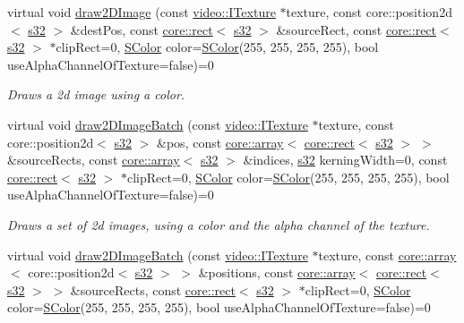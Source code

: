 \begin{DoxyCompactItemize}
virtual void \hyperlink{classirr_1_1video_1_1IVideoDriver_a167d3a5e2ea5804bfa9ba9e526bbcdb3}{draw2\+D\+Image} (const \hyperlink{classirr_1_1video_1_1ITexture}{video\+::\+I\+Texture} $\ast$texture, const core\+::position2d$<$ \hyperlink{namespaceirr_ac66849b7a6ed16e30ebede579f9b47c6}{s32} $>$ \&dest\+Pos, const \hyperlink{classirr_1_1core_1_1rect}{core\+::rect}$<$ \hyperlink{namespaceirr_ac66849b7a6ed16e30ebede579f9b47c6}{s32} $>$ \&source\+Rect, const \hyperlink{classirr_1_1core_1_1rect}{core\+::rect}$<$ \hyperlink{namespaceirr_ac66849b7a6ed16e30ebede579f9b47c6}{s32} $>$ $\ast$clip\+Rect=0, \hyperlink{classirr_1_1video_1_1SColor}{S\+Color} color=\hyperlink{classirr_1_1video_1_1SColor}{S\+Color}(255, 255, 255, 255), bool use\+Alpha\+Channel\+Of\+Texture=false)=0
\begin{DoxyCompactList}\small\item\em Draws a 2d image using a color. \end{DoxyCompactList}\item 
virtual void \hyperlink{classirr_1_1video_1_1IVideoDriver_a1b7647e900a56f23abb0809fd533617e}{draw2\+D\+Image\+Batch} (const \hyperlink{classirr_1_1video_1_1ITexture}{video\+::\+I\+Texture} $\ast$texture, const core\+::position2d$<$ \hyperlink{namespaceirr_ac66849b7a6ed16e30ebede579f9b47c6}{s32} $>$ \&pos, const \hyperlink{classirr_1_1core_1_1array}{core\+::array}$<$ \hyperlink{classirr_1_1core_1_1rect}{core\+::rect}$<$ \hyperlink{namespaceirr_ac66849b7a6ed16e30ebede579f9b47c6}{s32} $>$ $>$ \&source\+Rects, const \hyperlink{classirr_1_1core_1_1array}{core\+::array}$<$ \hyperlink{namespaceirr_ac66849b7a6ed16e30ebede579f9b47c6}{s32} $>$ \&indices, \hyperlink{namespaceirr_ac66849b7a6ed16e30ebede579f9b47c6}{s32} kerning\+Width=0, const \hyperlink{classirr_1_1core_1_1rect}{core\+::rect}$<$ \hyperlink{namespaceirr_ac66849b7a6ed16e30ebede579f9b47c6}{s32} $>$ $\ast$clip\+Rect=0, \hyperlink{classirr_1_1video_1_1SColor}{S\+Color} color=\hyperlink{classirr_1_1video_1_1SColor}{S\+Color}(255, 255, 255, 255), bool use\+Alpha\+Channel\+Of\+Texture=false)=0
\begin{DoxyCompactList}\small\item\em Draws a set of 2d images, using a color and the alpha channel of the texture. \end{DoxyCompactList}\item 
virtual void \hyperlink{classirr_1_1video_1_1IVideoDriver_a6485a684c4dfa4d0f94d0edfb46439a6}{draw2\+D\+Image\+Batch} (const \hyperlink{classirr_1_1video_1_1ITexture}{video\+::\+I\+Texture} $\ast$texture, const \hyperlink{classirr_1_1core_1_1array}{core\+::array}$<$ core\+::position2d$<$ \hyperlink{namespaceirr_ac66849b7a6ed16e30ebede579f9b47c6}{s32} $>$ $>$ \&positions, const \hyperlink{classirr_1_1core_1_1array}{core\+::array}$<$ \hyperlink{classirr_1_1core_1_1rect}{core\+::rect}$<$ \hyperlink{namespaceirr_ac66849b7a6ed16e30ebede579f9b47c6}{s32} $>$ $>$ \&source\+Rects, const \hyperlink{classirr_1_1core_1_1rect}{core\+::rect}$<$ \hyperlink{namespaceirr_ac66849b7a6ed16e30ebede579f9b47c6}{s32} $>$ $\ast$clip\+Rect=0, \hyperlink{classirr_1_1video_1_1SColor}{S\+Color} color=\hyperlink{classirr_1_1video_1_1SColor}{S\+Color}(255, 255, 255, 255), bool use\+Alpha\+Channel\+Of\+Texture=false)=0

\end{DoxyCompactItemize}
